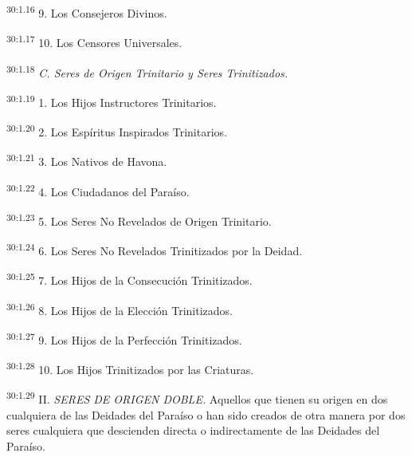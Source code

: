 \par
\textsuperscript{30:1.16} 9. Los Consejeros Divinos.

\par
\textsuperscript{30:1.17} 10. Los Censores Universales.

\par
\textsuperscript{30:1.18} \textit{C. Seres de Origen Trinitario y Seres Trinitizados.}

\par
\textsuperscript{30:1.19} 1. Los Hijos Instructores Trinitarios.

\par
\textsuperscript{30:1.20} 2. Los Espíritus Inspirados Trinitarios.

\par
\textsuperscript{30:1.21} 3. Los Nativos de Havona.

\par
\textsuperscript{30:1.22} 4. Los Ciudadanos del Paraíso.

\par
\textsuperscript{30:1.23} 5. Los Seres No Revelados de Origen Trinitario.

\par
\textsuperscript{30:1.24} 6. Los Seres No Revelados Trinitizados por la Deidad.

\par
\textsuperscript{30:1.25} 7. Los Hijos de la Consecución Trinitizados.

\par
\textsuperscript{30:1.26} 8. Los Hijos de la Elección Trinitizados.

\par
\textsuperscript{30:1.27} 9. Los Hijos de la Perfección Trinitizados.

\par
\textsuperscript{30:1.28} 10. Los Hijos Trinitizados por las Criaturas.

\par
\textsuperscript{30:1.29} II. \textit{SERES DE ORIGEN DOBLE.} Aquellos que tienen su origen en dos cualquiera de las Deidades del Paraíso o han sido creados de otra manera por dos seres cualquiera que descienden directa o indirectamente de las Deidades del Paraíso.

